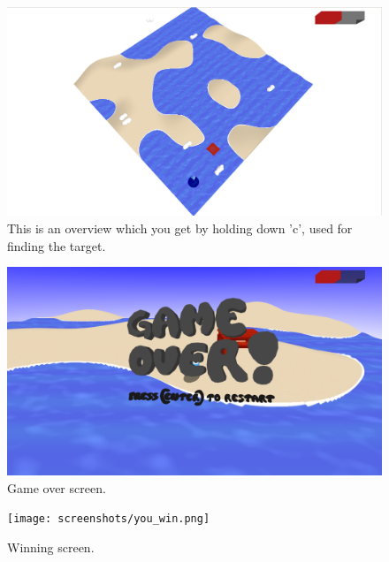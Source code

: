 \documentclass[11pt]{article}
\begin{document}
\begin{figure}[h!]
\centering
\includegraphics[width=\textwidth]{screenshots/ingame_1.png}
\caption{This is an overview which you get by holding down 'c', used for finding the target.}
\end{figure}


\begin{figure}[h!]
\centering
\includegraphics[width=\textwidth]{screenshots/game_over_sand.png}
\caption{Game over screen.}
\end{figure}


\begin{figure}[h!]
\centering
\texttt{[image: screenshots/you\_win.png]}
\caption{Winning screen.}
\end{figure}
\end{document}
